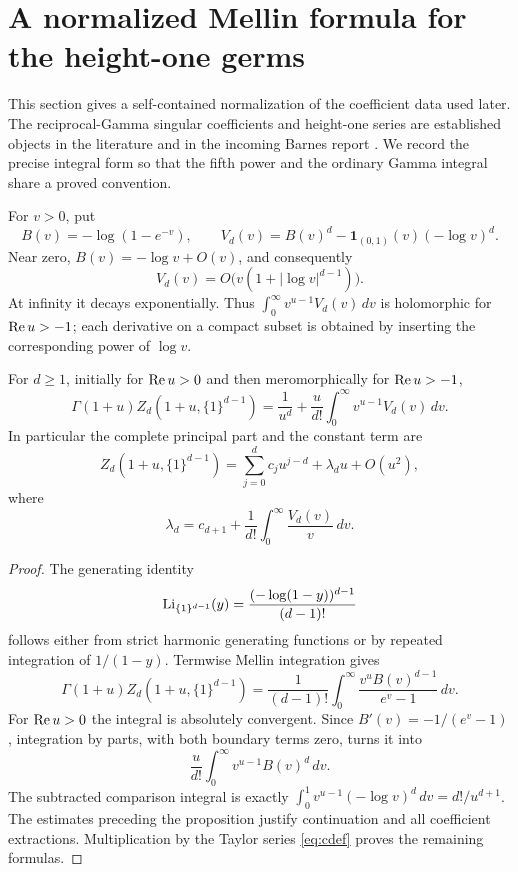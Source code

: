 \section{A normalized Mellin formula for the height-one germs}
\label{sec:laurent}

This section gives a self-contained normalization of the coefficient
data used later. The reciprocal-Gamma singular coefficients and
height-one series are established objects in the literature
\cite{Young2023,Young2024} and in the incoming Barnes report
\cite{Barnes}. We record the precise integral form so that the fifth
power and the ordinary Gamma integral share a proved convention.

For $v>0$, put
\begin{equation}\label{eq:Vdef}
 B(v)=-\log(1-e^{-v}),\qquad
 V_d(v)=B(v)^d-\boldsymbol1_{(0,1)}(v)(-\log v)^d.
\end{equation}
Near zero, $B(v)=-\log v+O(v)$, and consequently
\[
 V_d(v)=O\bigl(v(1+|\log v|^{d-1})\bigr).
\]
At infinity it decays exponentially. Thus
$\int_0^\infty v^{u-1}V_d(v)\,dv$ is holomorphic for
$\operatorname{Re} u>-1$; each derivative on a compact subset is obtained by
inserting the corresponding power of $\log v$.

\begin{proposition}\label{prop:mellin}
For $d\ge1$, initially for $\operatorname{Re} u>0$ and then meromorphically for
$\operatorname{Re} u>-1$,
\begin{equation}\label{eq:normalizedmellin}
 \boxed{\displaystyle
 \Gamma(1+u)Z_d(1+u,\{1\}^{d-1})
   =\frac1{u^d}+\frac{u}{d!}
       \int_0^\infty v^{u-1}V_d(v)\,dv.}
\end{equation}
In particular the complete principal part and the constant term are
\begin{equation}\label{eq:principal}
 Z_d(1+u,\{1\}^{d-1})
 =\sum_{j=0}^d c_j u^{j-d}+\lambda_du+O(u^2),
\end{equation}
where
\begin{equation}\label{eq:lambda_integral}
 \lambda_d=c_{d+1}+\frac1{d!}\int_0^\infty\frac{V_d(v)}v\,dv.
\end{equation}
\end{proposition}
\begin{proof}
The generating identity
\[
 \operatorname{Li}_{\{1\}^{d-1}}(y)=\frac{(-\log(1-y))^{d-1}}{(d-1)!}
\]
follows either from strict harmonic generating functions or by
repeated integration of $1/(1-y)$. Termwise Mellin integration gives
\[
 \Gamma(1+u)Z_d(1+u,\{1\}^{d-1})
  =\frac1{(d-1)!}\int_0^\infty
       \frac{v^u B(v)^{d-1}}{e^v-1}\,dv.
\]
For $\operatorname{Re} u>0$ the integral is absolutely convergent. Since
$B'(v)=-1/(e^v-1)$, integration by parts, with both boundary terms
zero, turns it into
\[
 \frac{u}{d!}\int_0^\infty v^{u-1}B(v)^d\,dv.
\]
The subtracted comparison integral is exactly
$\int_0^1v^{u-1}(-\log v)^d\,dv=d!/u^{d+1}$.
The estimates preceding the proposition justify continuation and all
coefficient extractions. Multiplication by the Taylor series
\eqref{eq:cdef} proves the remaining formulas.
\end{proof}

